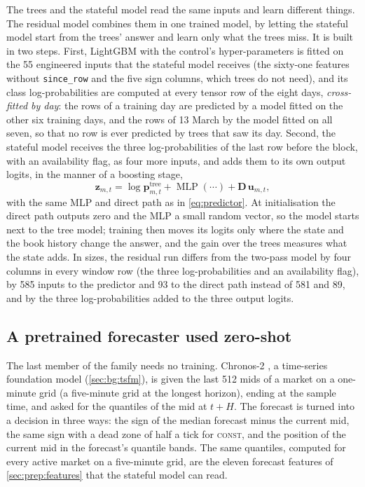 The trees and the stateful model read the same inputs and learn different things.  The
residual model combines them in one trained model, by letting the stateful model start from
the trees' answer and learn only what the trees miss.  It is built in two steps.  First,
LightGBM with the control's hyper-parameters is fitted on the 55 engineered inputs that the
stateful model receives (the sixty-one features without \texttt{since\_row} and the five
sign columns, which trees do not need), and its class log-probabilities are computed
at every tensor row of the eight days, \emph{cross-fitted by day}: the rows of a training
day are predicted by a model fitted on the other six training days, and the rows of 13 March
by the model fitted on all seven, so that no row is ever predicted by trees that saw its day.
Second, the stateful model receives the three log-probabilities of the last row before the
block, with an availability flag, as four more inputs, and adds them to its own output logits, in the manner of a
boosting stage,
\begin{equation}
  \mathbf{z}_{m,t} = \log \mathbf{p}^{\mathrm{tree}}_{m,t} + \operatorname{MLP}(\cdots) + \mathbf{D}\,\mathbf{u}_{m,t},
  \label{eq:residual}
\end{equation}
with the same MLP and direct path as in \cref{eq:predictor}.  At initialisation the direct
path outputs zero and the MLP a small random vector, so the model starts next to the tree
model; training then moves
its logits only where the state and the book history change the answer, and the gain over
the trees measures what the state adds.  In sizes, the residual run differs from the
two-pass model by four columns in every window row (the three log-probabilities and an
availability flag), by 585 inputs to the predictor and 93 to the direct path instead of 581
and 89, and by the three log-probabilities added to the three output logits.

\subsection{A pretrained forecaster used zero-shot}
\label{sec:models:zeroshot}

The last member of the family needs no training.  Chronos-2 \cite{ansari2025chronos2}, a
time-series foundation model (\cref{sec:bg:tsfm}), is given the last 512 mids of a
market on a one-minute grid (a five-minute grid at the longest horizon), ending at the
sample time, and asked for the quantiles of the mid at $t + H$.  The forecast is turned
into a decision in three ways: the sign of the median forecast minus the current mid, the
same sign with a dead zone of half a tick for \textsc{const}, and the position of the current mid in the
forecast's quantile bands.  The same quantiles, computed for every active market on a
five-minute grid, are the eleven forecast features of \cref{sec:prep:features} that the
stateful model can read.

